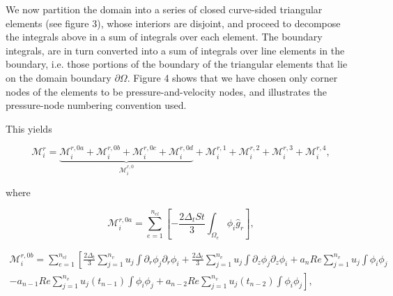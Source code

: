 \documentclass{article}
\begin{document}
We now partition the domain into a series of closed curve-sided triangular elements (see figure 3), whose interiors are disjoint, and proceed to decompose the integrals above in a sum of integrals over each element. The boundary integrals, are in turn converted into a sum of integrals over line elements in the boundary, i.e. those portions of the boundary of the triangular elements that lie on the domain boundary \(\partial\Omega\). Figure 4 shows that we have chosen only corner nodes of the elements to be pressure-and-velocity nodes, and illustrates the pressure-node numbering convention used.

This yields

\begin{equation}
\mathcal{M}_i^r = \underbrace{\mathcal{M}_i^{r,0a} + \mathcal{M}_i^{r,0b} + \mathcal{M}_i^{r,0c} + \mathcal{M}_i^{r,0d}}_{\mathcal{M}_i^{r,0}} + \mathcal{M}_i^{r,1} + \mathcal{M}_i^{r,2} + \mathcal{M}_i^{r,3} + \mathcal{M}_i^{r,4}, \tag{4.97}
\end{equation}

where

\begin{equation}
\mathcal{M}_i^{r,0a} = \sum_{e=1}^{n_{el}} \left[ -\frac{2\Delta_t St}{3} \int_{\Omega_e} \phi_i \hat{g}_r \right], \tag{4.98}
\end{equation}

\begin{equation}
\begin{array}{l} \mathcal{M}_i^{r,0b} = \sum_{e=1}^{n_{el}} \left[ \frac{2\Delta_t}{3} \sum_{j=1}^{n_v} u_j \int \partial_r \phi_j \partial_r \phi_i + \frac{2\Delta_t}{3} \sum_{j=1}^{n_v} u_j \int \partial_z \phi_j \partial_z \phi_i + a_n Re \sum_{j=1}^{n_v} u_j \int \phi_i \phi_j \right. \\ \left. - a_{n-1} Re \sum_{j=1}^{n_v} u_j(t_{n-1}) \int \phi_i \phi_j + a_{n-2} Re \sum_{j=1}^{n_v} u_j(t_{n-2}) \int \phi_i \phi_j \right], \end{array} \tag{4.99}
\end{equation}
\end{document}

